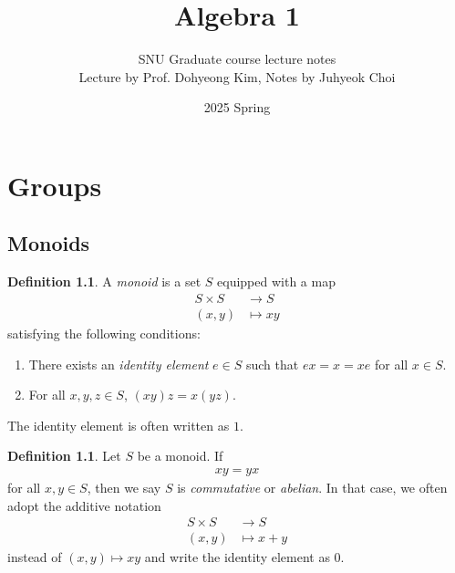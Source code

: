 \documentclass[12pt]{report}
\theoremstyle{plain}
\theoremstyle{remark}
\theoremstyle{definition}
\newtheorem{definition}[theorem]{Definition}
\begin{document}
 
\title{Algebra 1}
\author{SNU Graduate course lecture notes \\ Lecture by Prof. Dohyeong Kim, Notes by Juhyeok Choi}
\date{2025 Spring}

 
\maketitle
\tableofcontents

\chapter{Groups}

\section{Monoids}
\begin{definition}
    A \emph{monoid} is a set $S$ equipped with a map
    \begin{align*}
        S\times S &\rightarrow S \\
        (x,y) &\mapsto xy
    \end{align*}
    satisfying the following conditions:
    \begin{enumerate}
        \item There exists an \emph{identity element} $e\in S$ such that $ex=x=xe$ for all $x\in S$.
        \item For all $x,y,z\in S$, $(xy)z = x(yz)$.
    \end{enumerate}
    The identity element is often written as $1$.
\end{definition}

\begin{definition}
    Let $S$ be a monoid. If
    \begin{align*}
        xy = yx
    \end{align*}
    for all $x,y\in S$, then we say $S$ is \emph{commutative} or \emph{abelian}. In that case, we often adopt the additive notation
    \begin{align*}
        S\times S &\rightarrow S \\
        (x,y) &\mapsto x+y
    \end{align*}
    instead of $(x,y)\mapsto xy$ and write the identity element as $0$.
\end{definition}
\end{document}
